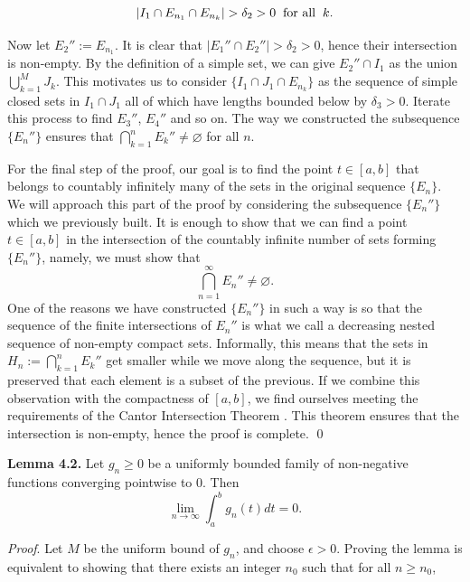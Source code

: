 \documentclass[12pt]{article}
\begin{document}
$$|I_1\cap E_{n_1}\cap E_{n_k}|>\delta_2>0\hspace{2mm}\text{for all}\hspace{2mm} k.$$ 

\vspace{2mm}

\noindent Now let $E_2'':=E_{n_1}$. It is clear that $|E_1''\cap E_2''|>\delta_2>0$, hence their intersection is non-empty. By the definition of a simple set, we can give $E_2''\cap I_1$ as the union $\bigcup_{k=1}^MJ_k$. This motivates us to consider $\{I_1\cap J_1\cap E_{n_k}\}$ as the sequence of simple closed sets in $I_1\cap J_1$ all of which have lengths bounded below by $\delta_3>0$. Iterate this process to find $E_3''$, $E_4''$ and so on. The way we constructed the subsequence $\{E_n''\}$ ensures that $\bigcap_{k=1}^nE_k''\neq \varnothing$ for all $n$.

\vspace{3mm}

\noindent For the final step of the proof, our goal is to find the point $t\in[a,b]$ that belongs to countably infinitely many of the sets in the original sequence $\{E_n\}$. We will approach this part of the proof by considering the subsequence $\{E_n''\}$ which we previously built. It is enough to show that we can find a point $t\in[a,b]$ in the intersection of the countably infinite number of sets forming $\{E_n''\}$, namely, we must show that $$\bigcap_{n=1}^\infty E_n''\neq\varnothing.$$ One of the reasons we have constructed $\{E_n''\}$ in such a way is so that the sequence of the finite intersections of $E_n''$ is what we call a decreasing nested sequence of non-empty compact sets. Informally, this means that the sets in $H_n:=\bigcap_{k=1}^nE_k''$ get smaller while we move along the sequence, but it is preserved that each element is a subset of the previous. If we combine this observation with the compactness of $[a,b]$,   we find ourselves meeting the requirements of the Cantor Intersection Theorem \cite{r7}. This theorem ensures that the intersection is non-empty, hence the proof is complete.
\qed


\vspace{5mm}

\noindent\textbf{Lemma 4.2.} Let $g_n\geq 0$ be a uniformly bounded family of non-negative functions converging pointwise to 0. Then $$\lim_{n\to\infty}\int_a^bg_n(t)dt=0.$$

\noindent\textit{Proof}. Let $M$ be the uniform bound of $g_n$, and choose $\epsilon>0$. Proving the lemma is equivalent to showing that there exists an integer $n_0$ such that for all $n\geq n_0$, 
\end{document}

